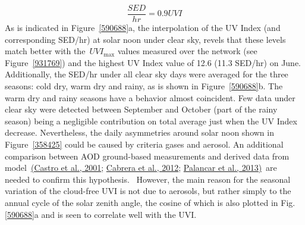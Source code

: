 \documentclass[10pt]{article}
\begin{document}
\[\frac{SED}{hr}=0.9UVI\]As is indicated in
Figure~{\ref{590688}}a, the interpolation of the UV
Index (and corresponding SED/hr) at solar noon under clear sky, revels
that these levels match better with the~\(UVI_{\max}\) values
measured over the network (see Figure~{\ref{931769}})
and the highest UV Index value of 12.6 (11.3 SED/hr) on June.
Additionally, the SED/hr under all clear sky days were averaged for the
three seasons: cold dry, warm dry and rainy, as is shown in
Figure~{\ref{590688}}b. The warm dry and rainy seasons
have a behavior almost coincident. Few data under clear sky were
detected between September and October (part of the rainy season) being
a negligible contribution on total average just when the UV Index
decrease. Nevertheless, the daily asymmetries around solar noon shown in
Figure~{\ref{358425}} could be caused by criteria gases
and aerosol. An additional comparison between AOD ground-based
measurements and derived data from model~\hyperref[csl:14]{(Castro et al., 2001}; \hyperref[csl:69]{Cabrera et al., 2012}; \hyperref[csl:13]{Palancar et al., 2013)}~are needed
to confirm this hypothesis.~ However, the main reason for the seasonal
variation of the cloud-free UVI is not due to aerosols, but rather
simply to the annual cycle of the solar zenith angle, the cosine of
which is also plotted in Fig. {\ref{590688}}a and is
seen to correlate well with the UVI. ~
\end{document}
